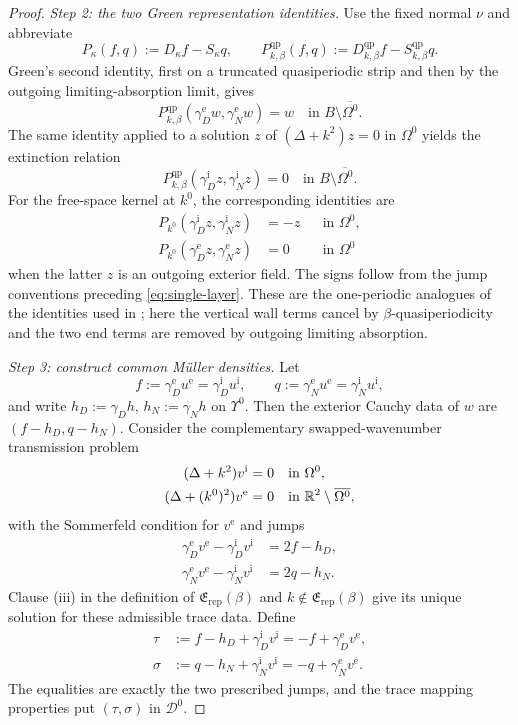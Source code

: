 \begin{proof}
\emph{Step 2: the two Green representation identities.}
Use the fixed normal $\nu$ and abbreviate
\[
  P_\kappa(f,q):=D_\kappa f-S_\kappa q,
  \qquad
  P^{\mathrm{qp}}_{k,\beta}(f,q)
  :=D^{\mathrm{qp}}_{k,\beta}f-S^{\mathrm{qp}}_{k,\beta}q.
\]
Green's second identity, first on a truncated quasiperiodic strip and then by
the outgoing limiting-absorption limit, gives
\[
  P^{\mathrm{qp}}_{k,\beta}
  (\gamma_D^{\mathrm e}w,\gamma_N^{\mathrm e}w)
  =w
  \quad\text{in }B\setminus\overline{\Omega^0}.
\]
The same identity applied to a solution $z$ of $(\Delta+k^2)z=0$ in
$\Omega^0$ yields the extinction relation
\[
  P^{\mathrm{qp}}_{k,\beta}
  (\gamma_D^{\mathrm i}z,\gamma_N^{\mathrm i}z)=0
  \quad\text{in }B\setminus\overline{\Omega^0}.
\]
For the free-space kernel at $k^0$, the corresponding identities are
\begin{align*}
  P_{k^0}(\gamma_D^{\mathrm i}z,\gamma_N^{\mathrm i}z)
  &=-z&&\text{in }\Omega^0,\\
  P_{k^0}(\gamma_D^{\mathrm e}z,\gamma_N^{\mathrm e}z)
  &=0&&\text{in }\Omega^0
\end{align*}
when the latter $z$ is an outgoing exterior field.  The signs follow from
the jump conventions preceding \eqref{eq:single-layer}.  These are the
one-periodic analogues of the identities used in
\cite[Appendix~A, Lemmas~9--10]{BarnettGreengard2010}; here the vertical
wall terms cancel by $\beta$-quasiperiodicity and the two end terms are
removed by outgoing limiting absorption.

\emph{Step 3: construct common M\"uller densities.}
Let
\[
  f:=\gamma_D^{\mathrm e}u^{\mathrm e}
    =\gamma_D^{\mathrm i}u^{\mathrm i},
  \qquad
  q:=\gamma_N^{\mathrm e}u^{\mathrm e}
    =\gamma_N^{\mathrm i}u^{\mathrm i},
\]
and write $h_D:=\gamma_Dh$, $h_N:=\gamma_Nh$ on $\Upsilon^0$.  Then the
exterior Cauchy data of $w$ are $(f-h_D,q-h_N)$.  Consider the complementary
swapped-wavenumber transmission problem
\begin{align*}
  (\Delta+k^2)v^{\mathrm i}&=0
    &&\text{in }\Omega^0,\\
  (\Delta+(k^0)^2)v^{\mathrm e}&=0
    &&\text{in }\mathbb{R}^2\setminus\overline{\Omega^0},
\end{align*}
with the Sommerfeld condition for $v^{\mathrm e}$ and jumps
\begin{align*}
  \gamma_D^{\mathrm e}v^{\mathrm e}
  -\gamma_D^{\mathrm i}v^{\mathrm i}&=2f-h_D,\\
  \gamma_N^{\mathrm e}v^{\mathrm e}
  -\gamma_N^{\mathrm i}v^{\mathrm i}&=2q-h_N.
\end{align*}
Clause (iii) in the definition of
$\mathfrak E_{\mathrm{rep}}(\beta)$ and
$k\notin\mathfrak E_{\mathrm{rep}}(\beta)$ give its unique solution for
these admissible trace data.  Define
\begin{align*}
  \tau
  &:=f-h_D+\gamma_D^{\mathrm i}v^{\mathrm i}
    =-f+\gamma_D^{\mathrm e}v^{\mathrm e},\\
  \sigma
  &:=q-h_N+\gamma_N^{\mathrm i}v^{\mathrm i}
    =-q+\gamma_N^{\mathrm e}v^{\mathrm e}.
\end{align*}
The equalities are exactly the two prescribed jumps, and the trace mapping
properties put $(\tau,\sigma)$ in $\mathcal D^0$.


\end{proof}
